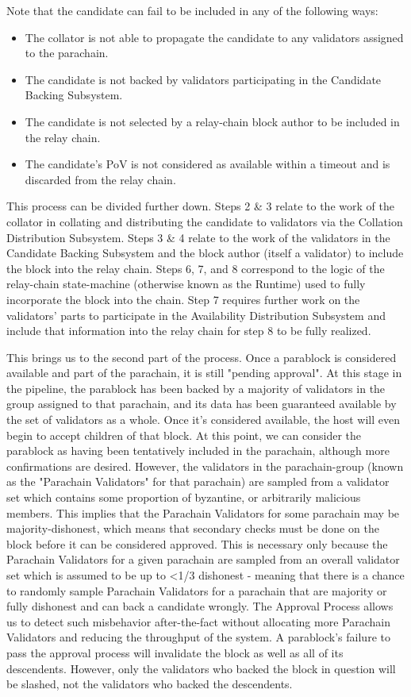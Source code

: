 Note that the candidate can fail to be included in any of the following ways:

\begin{itemize}
    \item The collator is not able to propagate the candidate to any validators assigned to the parachain.
    \item The candidate is not backed by validators participating in the Candidate Backing Subsystem.
    \item The candidate is not selected by a relay-chain block author to be included in the relay chain.
    \item The candidate's PoV is not considered as available within a timeout and is discarded from the relay chain.
\end{itemize}

This process can be divided further down. Steps 2 & 3 relate to the work of the collator in collating and distributing the candidate to validators via the Collation Distribution Subsystem. Steps 3 & 4 relate to the work of the validators in the Candidate Backing Subsystem and the block author (itself a validator) to include the block into the relay chain. Steps 6, 7, and 8 correspond to the logic of the relay-chain state-machine (otherwise known as the Runtime) used to fully incorporate the block into the chain. Step 7 requires further work on the validators' parts to participate in the Availability Distribution Subsystem and include that information into the relay chain for step 8 to be fully realized.

This brings us to the second part of the process. Once a parablock is considered available and part of the parachain, it is still "pending approval". At this stage in the pipeline, the parablock has been backed by a majority of validators in the group assigned to that parachain, and its data has been guaranteed available by the set of validators as a whole. Once it's considered available, the host will even begin to accept children of that block. At this point, we can consider the parablock as having been tentatively included in the parachain, although more confirmations are desired. However, the validators in the parachain-group (known as the "Parachain Validators" for that parachain) are sampled from a validator set which contains some proportion of byzantine, or arbitrarily malicious members. This implies that the Parachain Validators for some parachain may be majority-dishonest, which means that secondary checks must be done on the block before it can be considered approved. This is necessary only because the Parachain Validators for a given parachain are sampled from an overall validator set which is assumed to be up to <1/3 dishonest - meaning that there is a chance to randomly sample Parachain Validators for a parachain that are majority or fully dishonest and can back a candidate wrongly. The Approval Process allows us to detect such misbehavior after-the-fact without allocating more Parachain Validators and reducing the throughput of the system. A parablock's failure to pass the approval process will invalidate the block as well as all of its descendents. However, only the validators who backed the block in question will be slashed, not the validators who backed the descendents.


